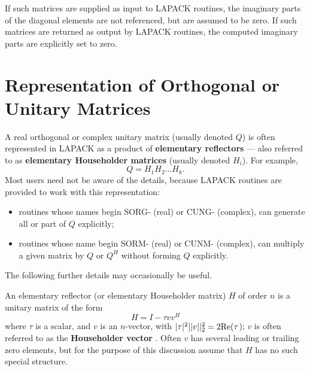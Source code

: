 If such matrices are supplied as input to LAPACK routines,
the imaginary parts of the diagonal elements are not referenced, 
but are assumed to be zero. If such matrices are returned as output by LAPACK
routines, the computed imaginary parts are explicitly set to zero.

\section{Representation of Orthogonal or Unitary Matrices}\label{secorthog}

A real orthogonal or complex unitary matrix (usually denoted $Q$) is often 
represented in
LAPACK as a product of {\bf elementary reflectors} --- also referred to as
{\bf elementary Householder matrices} (usually denoted $H_{i}$). For example,
\[ Q = H_{1} H_{2} \ldots H_{k}. \]
Most users need not be aware
of the details, because LAPACK routines are provided to work with this
representation:

\begin{itemize}

\item routines whose names begin SORG- (real) or CUNG- (complex), can generate
all or part of $Q$ explicitly;

\item routines whose name begin SORM- (real) or CUNM- (complex), can multiply
a given matrix by $Q$ or $Q^{H}$ without forming $Q$ explicitly.

\end{itemize}

The following further details may occasionally be useful.

An elementary reflector (or elementary Householder matrix) $H$ of order
$n$ is a
unitary matrix of the form
\begin{equation}
H = I - \tau v v^{H} \label{Hdef}
\end{equation}
where $\tau$ is a scalar, and $v$ is an $n$-vector, with
$| \tau | ^2   || v || _2 ^2 = 2 \rm{Re}(\tau$);  $v$ is often referred to
as the {\bf Householder vector} .
Often $v$ has several leading or trailing zero elements, but for the
purpose of this discussion assume that $H$ has no such special structure.

